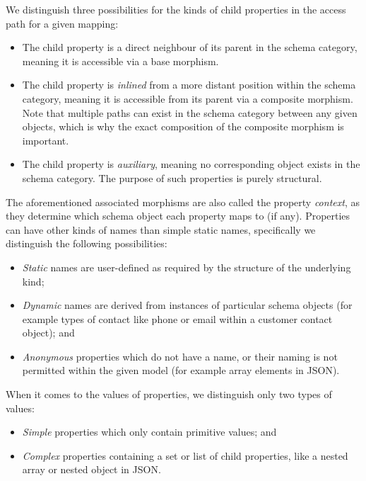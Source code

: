 We distinguish three possibilities for the kinds of child properties in the access path for a given mapping:

\begin{itemize}
    \item The child property is a direct neighbour of its parent in the schema category, meaning it is accessible via a base morphism.
    \item The child property is \textit{inlined} from a more distant position within the schema category, meaning it is accessible from its parent via a composite morphism. Note that multiple paths can exist in the schema category between any given objects, which is why the exact composition of the composite morphism is important.
    \item The child property is \textit{auxiliary}, meaning no corresponding object exists in the schema category. The purpose of such properties is purely structural.
\end{itemize}

The aforementioned associated morphisms are also called the property \textit{context}, as they determine which schema object each property maps to (if any).
Properties can have other kinds of names than simple static names, specifically we distinguish the following possibilities:

\begin{itemize}
    \item \textit{Static} names are user-defined as required by the structure of the underlying kind;
    \item \textit{Dynamic} names are derived from instances of particular schema objects (for example types of contact like phone or email within a customer contact object); and
    \item \textit{Anonymous} properties which do not have a name, or their naming is not permitted within the given model (for example array elements in JSON).
\end{itemize}

When it comes to the values of properties, we distinguish only two types of values:

\begin{itemize}
    \item \textit{Simple} properties which only contain primitive values; and
    \item \textit{Complex} properties containing a set or list of child properties, like a nested array or nested object in JSON. 
\end{itemize}

